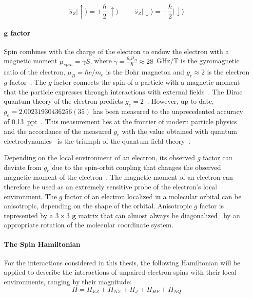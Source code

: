 \begin{equation}
\label{eq:sz_states}
\hat{s}_Z\vert{\uparrow}\rangle = +\frac{\hbar}{2}\vert{\uparrow\rangle}\,\,\,\,\,\,\,\,\,\,\,\,\,\,\hat{s}_Z\vert{\downarrow\rangle}=-\frac{\hbar}{2}\vert{\downarrow\rangle}
\end{equation}


\paragraph*{$\textbf{g}$ factor}

Spin combines with the charge of the electron to endow the electron with a magnetic moment $\mu_{spin} = \gamma S$, where $\gamma=\frac{g_e\mu_B}{\hbar}\approx 28$~GHz/T is the gyromagnetic ratio of the electron, $\mu_B=\hbar e/m_e$ is the Bohr magneton and $g_e \approx 2$ is the electron $g$ factor~\cite{Carrington_g_factor}. The $g$ factor connects the spin of a particle with a magnetic moment that the particle expresses through interactions with external fields~\cite{Schwinger1948}. The Dirac quantum theory of the electron predicts $g_e=2$~\cite{dirac1928}. However, up to date, $g_e = 2.00231930436256(35)$ has been measured to the unprecedented accuracy of 0.13~ppt~\cite{Fan2023_PRL}. This measurement lies at the frontier of modern particle physics and the accordance of the measured $g_e$ with the value obtained with quantum electrodynamics~\cite{Schwinger1948,Fan2023_PRL} is the triumph of the quantum field theory~\cite{Feynman_1949}. 
\par
Depending on the local environment of an electron, its observed $g$ factor can deviate from $g_e$ due to the spin-orbit coupling that changes the observed magnetic moment of the electron~\cite{Carrington_g_factor}. The magnetic moment of an electron can therefore be used as an extremely sensitive probe of the electron's local environment. The $g$ factor of an electron localized in a molecular orbital can be anisotropic, depending on the shape of the orbital. Anisotropic $g$ factor is represented by a $3\times3$ $\textbf{g}$ matrix that can almost always be diagonalized~\cite{Carrington_g_factor} by an appropriate rotation of the molecular coordinate system.

\paragraph*{The Spin Hamiltonian}
For the interactions considered in this thesis, the following Hamiltonian will be applied to describe the interactions of unpaired electron spins with their local environments, ranging by their magnitude:
\begin{equation}
\label{spin_hamiltonian}
H = H_{EZ} + H_{NZ} + H_{J} + H_{HF} + H_{NQ}
\end{equation}


